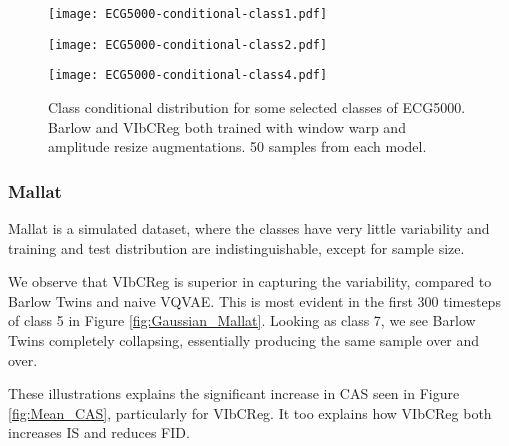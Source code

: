\documentclass[../../thesis.tex]{subfiles}
\begin{document}
\begin{figure}[H]
    \centering
    \begin{minipage}[b]{0.32\textwidth}
        \centering
        \texttt{[image: ECG5000-conditional-class1.pdf]}
    \end{minipage}
    \begin{minipage}[b]{0.32\textwidth}
        \centering
        \texttt{[image: ECG5000-conditional-class2.pdf]}
    \end{minipage}
    \begin{minipage}[b]{0.32\textwidth}
        \centering
        \texttt{[image: ECG5000-conditional-class4.pdf]}
    \end{minipage}
    \caption{Class conditional distribution for some selected classes of ECG5000. Barlow and VIbCReg both trained with window warp and amplitude resize augmentations. 50 samples from each model.}
    \label{fig:Warp_ECG5000}
\end{figure}


\subsubsection{Mallat}
Mallat is a simulated dataset, where the classes have very little variability and training and test distribution are indistinguishable, except for sample size. \newline

We observe that VIbCReg is superior in capturing the variability, compared to Barlow Twins and naive VQVAE. This is most evident in the first 300 timesteps of class 5 in Figure \ref{fig:Gaussian_Mallat}. Looking as class 7, we see Barlow Twins completely collapsing, essentially producing the same sample over and over. \newline

These illustrations explains the significant increase in CAS seen in Figure \ref{fig:Mean_CAS}, particularly for VIbCReg. It too explains how VIbCReg both increases IS and reduces FID. \newline



\end{document}
